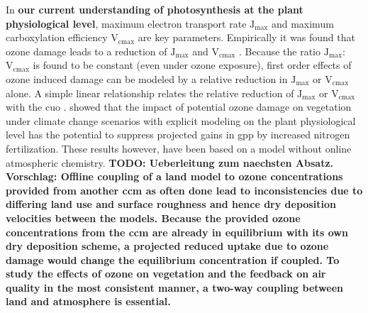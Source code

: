 In \textbf{our current understanding of photosynthesis at the plant physiological level}, maximum electron transport rate $\mathrm{J_{max}}$ and maximum carboxylation efficiency $\mathrm{V_{cmax}}$ are key parameters. Empirically it was found that ozone damage leads to a reduction of  $\mathrm{J_{max}}$ and $\mathrm{V_{cmax}}$ \parencite{EJA:Emberson2018}. Because the ratio $\mathrm{J_{max}}$:$\mathrm{V_{cmax}}$ is found to be constant (even under ozone exposure), first order effects of ozone induced damage can be modeled by a relative reduction in $\mathrm{J_{max}}$ or $\mathrm{V_{cmax}}$ alone. A simple linear relationship relates the relative reduction of $\mathrm{J_{max}}$ or $\mathrm{V_{cmax}}$ with the \gls{cuo} \parencites{BGS:Franz2017}{BGS:Franz2018}. \textcite{BGSD:Franz2020} showed that the impact of potential ozone damage on vegetation under climate change scenarios with explicit modeling on the plant physiological level has the potential to suppress projected gains in \gls{gpp} by increased nitrogen fertilization. These results however, have been based on a model without online atmospheric chemistry. \textbf{\color{red}TODO: Ueberleitung zum naechsten Absatz. \color{blue}Vorschlag: Offline coupling of a land model to ozone concentrations provided from another \gls{ccm} as often done lead to inconsistencies due to differing land use and surface roughness and hence dry deposition velocities between the models. Because the provided ozone concentrations from the \gls{ccm} are already in equilibrium with its own dry deposition scheme, a projected reduced uptake due to ozone damage would change the equilibrium concentration if coupled. To study the effects of ozone on vegetation and the feedback on air quality in the most consistent manner, a two-way coupling between land and atmosphere is essential.}\\


